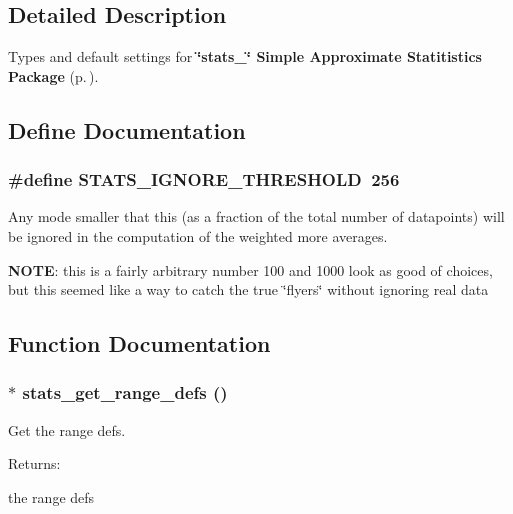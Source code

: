 \subsection{Detailed Description}
Types and default settings for {\bf \char`\"{}stats\_\-\char`\"{} Simple Approximate Statitistics Package} {\rm (p.\,\pageref{group__stats})}.





\subsection{Define Documentation}
\subsubsection{\setlength{\rightskip}{0pt plus 5cm}\#define STATS\_\-IGNORE\_\-THRESHOLD\ 256}\label{bucket__stats_8h_a3}


Any mode smaller that this (as a fraction of the total number of datapoints) will be ignored in the computation of the weighted more averages.

{\bf NOTE}: this is a fairly arbitrary number 100 and 1000 look as good of choices, but this seemed like a way to catch the true \char`\"{}flyers\char`\"{} without ignoring real data 

\subsection{Function Documentation}
\subsubsection{$\ast$ stats\_\-get\_\-range\_\-defs ()}\label{bucket__stats_8h_a14}


Get the range defs.

\begin{Desc}
\item[Returns: ]\par
the range defs \end{Desc}
